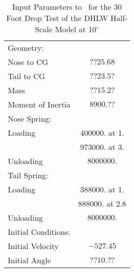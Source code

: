 \begin{table}
\begin{center}
\caption{Input Parameters to \SLAP\ for the 30 Foot Drop Test of the
DHLW Half-Scale Model at 10$^\circ$}
\makeqnum
\begin{tabular}{||l|c||}
\hline
Geometry: & \\
\quad Nose to CG         &$??25.68$\\
\quad Tail to CG         &$??23.5?$\\
\quad Mass               &$??15.2?$\\
\quad Moment of Inertia  &$8900.??$\\
Nose Spring: & \\
\quad Loading            &$400000.$ at 1.\\
                   &$973000.$ at 3.\\
\quad Unloading          &$8000000.$\\
Tail Spring: &\\
\quad Loading            &$388000.$ at 1.\\
                   &$888000.$ at 2.8\\
\quad Unloading          &$8000000.$\\
\hline
Initial Conditions: & \\
\quad Initial Velocity   &$-527.45$\\
\quad Initial Angle      &$??10.??$\\
\hline
\end{tabular}
\end{center}
\end{table}

